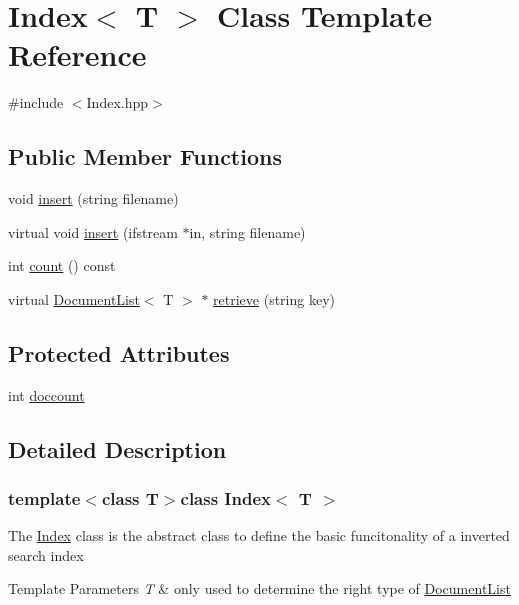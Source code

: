 \hypertarget{class_index}{\section{Index$<$ T $>$ Class Template Reference}
\label{class_index}
}


{\ttfamily \#include $<$Index.\-hpp$>$}

\subsection*{Public Member Functions}
\begin{DoxyCompactItemize}
\item 
void \hyperlink{class_index_a35c85c7054c05c544d9060e7acf050e0}{insert} (string filename)
\item 
virtual void \hyperlink{class_index_a95b7be97caee4aacf0405fa3fd29c457}{insert} (ifstream $\ast$in, string filename)
\item 
int \hyperlink{class_index_adceb37c739cf21b06cbb7dbd2913bfec}{count} () const 
\item 
virtual \hyperlink{class_document_list}{Document\-List}$<$ T $>$ $\ast$ \hyperlink{class_index_a149f5520f1c40fd73fd9ba1e683cec7d}{retrieve} (string key)
\end{DoxyCompactItemize}
\subsection*{Protected Attributes}
\begin{DoxyCompactItemize}
\item 
int \hyperlink{class_index_a40fd362b0f1e15ca09cf6c5234f202a2}{doccount}
\end{DoxyCompactItemize}


\subsection{Detailed Description}
\subsubsection*{template$<$class T$>$class Index$<$ T $>$}

The \hyperlink{class_index}{Index} class is the abstract class to define the basic funcitonality of a inverted search index 
\begin{DoxyTemplParams}{Template Parameters}
{\em T} & only used to determine the right type of \hyperlink{class_document_list}{Document\-List} \\
\hline
\end{DoxyTemplParams}


